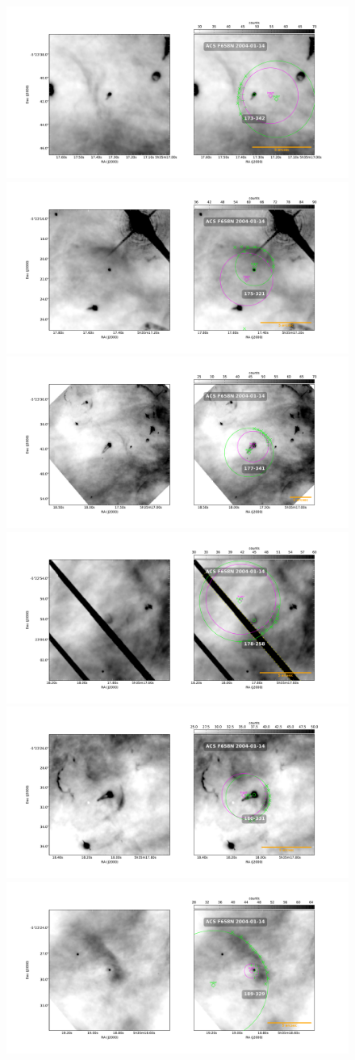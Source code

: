 \documentclass{article}
\begin{document}
\begin{figure}
  \centering
   \includegraphics[width=0.5\linewidth]{j8oc01010_wcs/173-342-Bally_01-images.pdf}
   \includegraphics[width=0.5\linewidth]{j8oc01010_wcs/175-321-Bally_01-images.pdf}
   \includegraphics[width=0.5\linewidth]{j8oc01010_wcs/177-341-Bally_01-images.pdf}
   \includegraphics[width=0.5\linewidth]{j8oc01010_wcs/178-258-Bally_01-images.pdf}
   \includegraphics[width=0.5\linewidth]{j8oc01010_wcs/180-331-Bally_01-images.pdf}
   \includegraphics[width=0.5\linewidth]{j8oc01010_wcs/189-329-Bally_01-images.pdf}
  \label{fig:images}
\end{figure}
\end{document}
